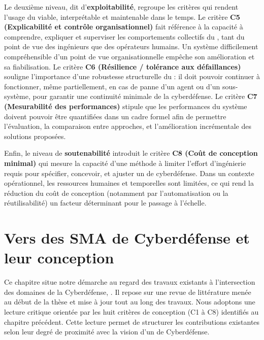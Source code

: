 Le deuxième niveau, dit d’\textbf{exploitabilité}, regroupe les critères qui rendent l’usage du  viable, interprétable et maintenable dans le temps. Le critère \textbf{C5 (Explicabilité et contrôle organisationnel)} fait référence à la capacité à comprendre, expliquer et superviser les comportements collectifs du , tant du point de vue des ingénieurs que des opérateurs humains. Un système difficilement compréhensible d'un point de vue organisationnelle empêche son amélioration et sa fiabilisation. Le critère \textbf{C6 (Résilience / tolérance aux défaillances)} souligne l’importance d’une robustesse structurelle du  : il doit pouvoir continuer à fonctionner, même partiellement, en cas de panne d’un agent ou d’un sous-système, pour garantir une continuité minimale de la cyberdéfense. Le critère \textbf{C7 (Mesurabilité des performances)} stipule que les performances du système doivent pouvoir être quantifiées dans un cadre formel afin de permettre l’évaluation, la comparaison entre approches, et l’amélioration incrémentale des solutions proposées.

Enfin, le niveau de \textbf{soutenabilité} introduit le critère \textbf{C8 (Coût de conception minimal)} qui mesure la capacité d’une méthode à limiter l’effort d’ingénierie requis pour spécifier, concevoir, et ajuster un  de cyberdéfense. Dans un contexte opérationnel, les ressources humaines et temporelles sont limitées, ce qui rend la réduction du coût de conception (notamment par l’automatisation ou la réutilisabilité) un facteur déterminant pour le passage à l'échelle.

\clearpage
\thispagestyle{empty}
\null
\newpage


\chapter{Vers des SMA de Cyberdéfense et leur conception}

% 

\noindent
Ce chapitre situe notre démarche au regard des travaux existants à l'intersection des domaines de la Cyberdéfense, . Il repose sur une revue de littérature menée au début de la thèse et mise à jour tout au long des travaux.
%
Nous adoptons une lecture critique orientée par les huit critères de conception (C1 à C8) identifiés au chapitre précédent. Cette lecture permet de structurer les contributions existantes selon leur degré de proximité avec la vision d'un  de Cyberdéfense.

